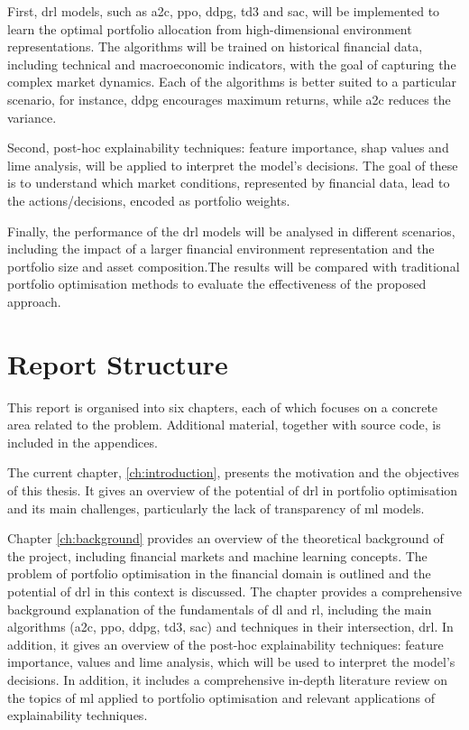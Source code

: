 First, \acrshort{drl} models, such as \acrfull{a2c}, \acrfull{ppo}, \acrfull{ddpg}, \acrfull{td3} and \acrfull{sac}, will be implemented to learn the optimal portfolio allocation from high-dimensional environment representations. The algorithms will be trained on historical financial data, including technical and macroeconomic indicators, with the goal of capturing the complex market dynamics. Each of the algorithms is better suited to a particular scenario, for instance, \acrshort{ddpg} encourages maximum returns, while \acrshort{a2c} reduces the variance.

Second, post-hoc explainability techniques: feature importance, \acrfull{shap} values and \acrfull{lime} analysis, will be applied to interpret the model's decisions. The goal of these is to understand which market conditions, represented by financial data, lead to the actions/decisions, encoded as portfolio weights. 

Finally, the performance of the \acrshort{drl} models will be analysed in different scenarios, including the impact of a larger financial environment representation and the portfolio size and asset composition.The results will be compared with traditional portfolio optimisation methods to evaluate the effectiveness of the proposed approach.

\section{Report Structure} \label{sec:introduction-structure}

This report is organised into six chapters, each of which focuses on a concrete area related to the problem. Additional material, together with source code, is included in the appendices. 

The current chapter, \ref{ch:introduction}, presents the motivation and the objectives of this thesis. It gives an overview of the potential of \acrshort{drl} in portfolio optimisation and its main challenges, particularly the lack of transparency of \acrshort{ml} models. 

Chapter \ref{ch:background} provides an overview of the theoretical background of the project, including financial markets and machine learning concepts. The problem of portfolio optimisation in the financial domain is outlined and the potential of \acrshort{drl} in this context is discussed. The chapter provides a comprehensive background explanation of the fundamentals of \acrlong{dl} and \acrlong{rl}, including the main algorithms (\acrshort{a2c}, \acrshort{ppo}, \acrshort{ddpg}, \acrshort{td3}, \acrshort{sac}) and techniques in their intersection, \acrshort{drl}. In addition, it gives an overview of the post-hoc explainability techniques: feature importance,  values and \acrfull{lime} analysis, which will be used to interpret the model's decisions. In addition, it includes a comprehensive in-depth literature review on the topics of \acrshort{ml} applied to portfolio optimisation and relevant applications of explainability techniques. 

